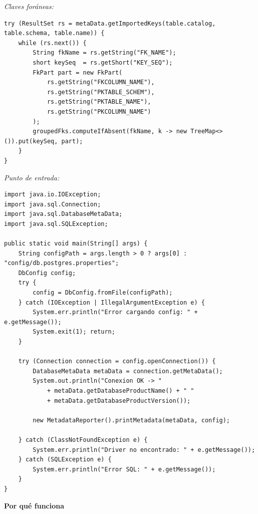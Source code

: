 \documentclass[11pt,a4paper]{article}
\newcommand{\itemcabecera}[1]{\noindent\textbf{#1}\par\medskip}
\newcommand{\bloquePorque}{\itemcabecera{Por qu\'e funciona}}
\begin{document}
\textit{Claves foráneas:}

\begin{lstlisting}
try (ResultSet rs = metaData.getImportedKeys(table.catalog, table.schema, table.name)) {
    while (rs.next()) {
        String fkName = rs.getString("FK_NAME");
        short keySeq  = rs.getShort("KEY_SEQ");
        FkPart part = new FkPart(
            rs.getString("FKCOLUMN_NAME"),
            rs.getString("PKTABLE_SCHEM"),
            rs.getString("PKTABLE_NAME"),
            rs.getString("PKCOLUMN_NAME")
        );
        groupedFks.computeIfAbsent(fkName, k -> new TreeMap<>()).put(keySeq, part);
    }
}
\end{lstlisting}

\textit{Punto de entrada:}

\begin{lstlisting}
import java.io.IOException;
import java.sql.Connection;
import java.sql.DatabaseMetaData;
import java.sql.SQLException;

public static void main(String[] args) {
    String configPath = args.length > 0 ? args[0] : "config/db.postgres.properties";
    DbConfig config;
    try {
        config = DbConfig.fromFile(configPath);
    } catch (IOException | IllegalArgumentException e) {
        System.err.println("Error cargando config: " + e.getMessage());
        System.exit(1); return;
    }

    try (Connection connection = config.openConnection()) {
        DatabaseMetaData metaData = connection.getMetaData();
        System.out.println("Conexion OK -> "
            + metaData.getDatabaseProductName() + " "
            + metaData.getDatabaseProductVersion());

        new MetadataReporter().printMetadata(metaData, config);

    } catch (ClassNotFoundException e) {
        System.err.println("Driver no encontrado: " + e.getMessage());
    } catch (SQLException e) {
        System.err.println("Error SQL: " + e.getMessage());
    }
}
\end{lstlisting}

\bloquePorque
\end{document}
